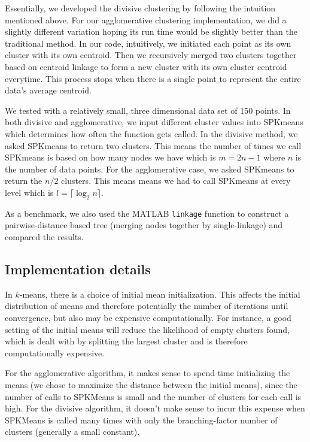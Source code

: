 \documentclass[../tech_report_1.tex]{subfiles}
\begin{document}
Essentially, we developed the divisive clustering by following the
intuition mentioned above. For our agglomerative clustering implementation,
we did a slightly different variation hoping its run time would be
slightly better than the traditional method. In our code, intuitively,
we initiated each point as its own cluster with its own centroid.
Then we recursively merged two clusters together based on centroid
linkage to form a new cluster with its own cluster centroid everytime.
This process stops when there is a single point to represent the entire
data's average centroid.

We tested with a relatively small,
three dimensional data set of 150 points. In both 
divisive and agglomerative, we input different cluster values into
SPKmeans which determines how often the function gets called. In the
divisive method, we asked SPKmeans to return two clusters.
This means the number of times we call SPKmeans
is based on how many nodes we have which is $m=2n-1$ where $n$ is
the number of data points. For the agglomerative case, we asked SPKmeans to
return the $n/2$ clusters. This means means we had to call SPKmeans
at every level which is $l=\lceil\log_{2}n\rceil$.


As a benchmark, we also used the MATLAB \texttt{linkage} function to construct a pairwise-distance based tree (merging nodes together by single-linkage) and compared the results.

\subsection*{Implementation details}

In $k$-means, there is a choice of initial mean initialization. This affects the initial distribution of means and therefore potentially the number of iterations until convergence, but also may be expensive computationally. For instance, a good setting of the initial means will reduce the likelihood of empty clusters found, which is dealt with by splitting the largest cluster and is therefore computationally expensive.

For the agglomerative algorithm, it makes sense to spend time initializing the means (we chose to maximize the distance between the initial means), since the number of calls to SPKMeans is small and the number of clusters for each call is high. For the divisive algorithm, it doesn't make sense to incur this expense when SPKMeans is called many times with only the branching-factor number of clusters (generally a small constant).
\end{document}
